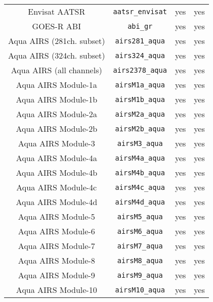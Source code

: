 \begin{center}
\begin{longtable}{c c c c}
  Envisat AATSR                      & \texttt{aatsr\_envisat}      &  yes     &  yes       \\
  GOES-R ABI                         & \texttt{abi\_gr}             &  yes     &  yes       \\
  Aqua AIRS (281ch. subset)          & \texttt{airs281\_aqua}       &  yes     &  yes       \\
  Aqua AIRS (324ch. subset)          & \texttt{airs324\_aqua}       &  yes     &  yes       \\
  Aqua AIRS (all channels)           & \texttt{airs2378\_aqua}      &  yes     &  yes       \\
  Aqua AIRS Module-1a                & \texttt{airsM1a\_aqua}       &  yes     &  yes       \\
  Aqua AIRS Module-1b                & \texttt{airsM1b\_aqua}       &  yes     &  yes       \\
  Aqua AIRS Module-2a                & \texttt{airsM2a\_aqua}       &  yes     &  yes       \\
  Aqua AIRS Module-2b                & \texttt{airsM2b\_aqua}       &  yes     &  yes       \\
  Aqua AIRS Module-3                 & \texttt{airsM3\_aqua}        &  yes     &  yes       \\
  Aqua AIRS Module-4a                & \texttt{airsM4a\_aqua}       &  yes     &  yes       \\
  Aqua AIRS Module-4b                & \texttt{airsM4b\_aqua}       &  yes     &  yes       \\
  Aqua AIRS Module-4c                & \texttt{airsM4c\_aqua}       &  yes     &  yes       \\
  Aqua AIRS Module-4d                & \texttt{airsM4d\_aqua}       &  yes     &  yes       \\
  Aqua AIRS Module-5                 & \texttt{airsM5\_aqua}        &  yes     &  yes       \\
  Aqua AIRS Module-6                 & \texttt{airsM6\_aqua}        &  yes     &  yes       \\
  Aqua AIRS Module-7                 & \texttt{airsM7\_aqua}        &  yes     &  yes       \\
  Aqua AIRS Module-8                 & \texttt{airsM8\_aqua}        &  yes     &  yes       \\
  Aqua AIRS Module-9                 & \texttt{airsM9\_aqua}        &  yes     &  yes       \\
  Aqua AIRS Module-10                & \texttt{airsM10\_aqua}       &  yes     &  yes       \\

\end{longtable}
\end{center}
